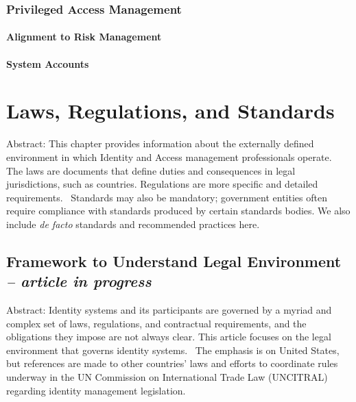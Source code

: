 \hypertarget{privileged-access-management}{%
\subsection{Privileged Access
Management}\label{privileged-access-management}}

\hypertarget{alignment-to-risk-management}{%
\subsubsection{Alignment to Risk
Management}\label{alignment-to-risk-management}}

\hypertarget{system-accounts}{%
\subsubsection{System Accounts}\label{system-accounts}}

\hypertarget{laws-regulations-and-standards}{%
\chapter{Laws, Regulations, and
Standards}\label{laws-regulations-and-standards}}

Abstract: This chapter provides information about the externally defined
environment in which Identity and Access management professionals
operate.~ The laws are documents that define duties and consequences in
legal jurisdictions, such as countries. Regulations are more specific
and detailed requirements.~ Standards may also be mandatory; government
entities often require compliance with standards produced by certain
standards bodies. We also include \emph{de facto} standards and
recommended practices here.

\hypertarget{framework-to-understand-legal-environment-article-in-progress}{%
\section{\texorpdfstring{Framework to Understand Legal Environment
\emph{-- article in
progress}}{Framework to Understand Legal Environment -- article in progress}}\label{framework-to-understand-legal-environment-article-in-progress}}

Abstract: Identity systems and its participants are governed by a myriad
and complex set of laws, regulations, and contractual requirements, and
the obligations they impose are not always clear. This article focuses
on the legal environment that governs identity systems.~ The emphasis is
on United States, but references are made to other countries' laws and
efforts to coordinate rules underway in the UN Commission on
International Trade Law (UNCITRAL) regarding identity management
legislation.

